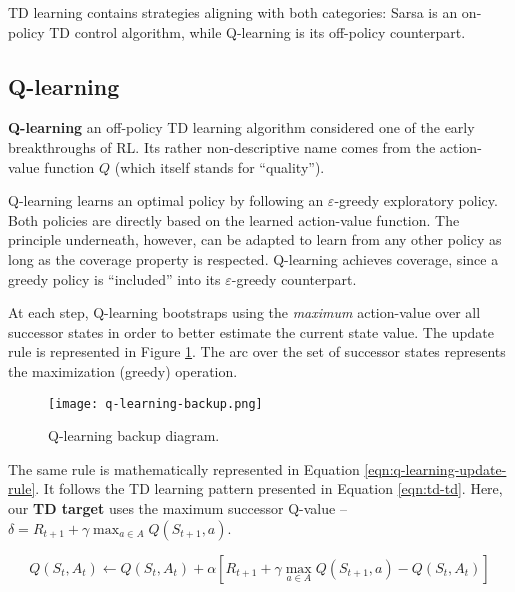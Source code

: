 
TD learning contains strategies aligning with both categories: Sarsa is an on-policy TD control algorithm, while Q-learning is its off-policy counterpart.

\subsection{Q-learning} \label{rl:q-learning}
\textbf{Q-learning} \cite{Watkins1992} an off-policy TD learning algorithm considered one of the early breakthroughs of RL.
Its rather non-descriptive name comes from the action-value function $Q$ (which itself stands for ``quality'').


Q-learning learns an optimal policy by following an $\varepsilon$-greedy exploratory policy.
Both policies are directly based on the learned action-value function.
The principle underneath, however, can be adapted to learn from any other policy as long as the coverage property is respected.
Q-learning achieves coverage, since a greedy policy is ``included'' into its $\varepsilon$-greedy counterpart.

At each step, Q-learning bootstraps using the \emph{maximum} action-value over all successor states in order to better estimate the current state value.
The update rule is represented in Figure \ref{fig:q-learning-backup}.
The arc over the set of successor states represents the maximization (greedy) operation.

\begin{figure}[h]
    \centering
    \texttt{[image: q-learning-backup.png]}
    \caption{Q-learning backup diagram.}
    \label{fig:q-learning-backup}
\end{figure}

The same rule is mathematically represented in Equation \ref{eqn:q-learning-update-rule}.
It follows the TD learning pattern presented in Equation \ref{eqn:td-td}. Here, our \textbf{TD target} uses the maximum successor Q-value -- $\delta = R_{t+1} + \gamma \max_{a \in A}{Q(S_{t+1}, a)}$.


\begin{equation} \label{eqn:q-learning-update-rule}
    Q(S_t, A_t) \leftarrow Q(S_t, A_t) + \alpha [
        R_{t+1} + \gamma \max_{a \in A}{Q(S_{t+1}, a)} - Q(S_t, A_t)
    ]
\end{equation}
